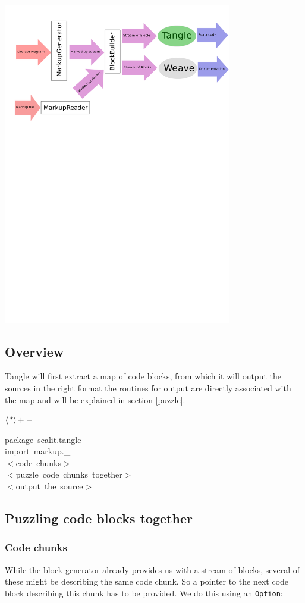 \documentclass[a4paper,12pt]{article}
\begin{document}
\includegraphics[width=10cm,viewport=310 710 600 800,clip]{images/tangle}

\subsection{Overview}
Tangle will first extract a map of code blocks, from which it will
output the sources in the right format the routines for output are
directly associated with the map and will be explained in section
\ref{puzzle}.

$\left<\mbox{\emph{*}}\right>+\equiv$
\begin{program}{\vem package}~scalit.tangle
\\{\vem import}~markup.\_
\\[0.5em]$<$code~chunks$>$
\\[0.5em]$<$puzzle~code~chunks~together$>$
\\[0.5em]$<$output~the~source$>$
\\[0.5em]\end{program}
\label{puzzle}\subsection{Puzzling code blocks together}
\subsubsection{Code chunks}
While the block generator already provides us with a stream of
blocks, several of these might be describing the same code chunk.
So a pointer to the next code block describing this chunk has to be
provided. We do this using an \texttt{Option}:
\end{document}
